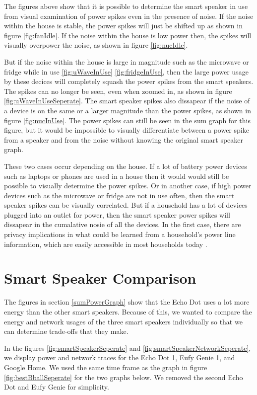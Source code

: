 The figures above show that it is possible to determine the smart speaker in use from visual examination of power spikes even in the presence of noise. If the noise within the house is stable, the power spikes will just be shifted up as shown in figure \ref{fig:fanIdle}. If the noise within the house is low power then, the spikes will visually overpower the noise, as shown in figure \ref{fig:nucIdle}.

But if the noise within the house is large in magnitude such as the microwave or fridge while in use \ref{fig:uWaveInUse} \ref{fig:fridgeInUse}, then the large power usage by these decices will completely squash the power spikes from the smart speakers. The spikes can no longer be seen, even when zoomed in, as shown in figure \ref{fig:uWaveInUseSeperate}. The smart speaker spikes also dissapear if the noise of a device is on the same or a larger magnitude than the power spikes, as shown in figure \ref{fig:nucInUse}. The power spikes can still be seen in the sum graph for this figure, but it would be impossible to visually differentiate between a power spike from a speaker and from the noise without knowing the original smart speaker graph.

These two cases occur depending on the house. If a lot of battery power devices such as laptops or phones are used in a house then it would would still be possible to visually determine the power spikes. Or in another case, if high power devices such as the microwave or fridge are not in use often, then the smart speaker spikes can be visually correlated. But if a household has a lot of devices plugged into an outlet for power, then the smart speaker power spikes will dissapear in the cumalative nosie of all the devices. In the first case, there are privacy implications in what could be learned from a household's power line information, which are easily accessible in most households today \cite{griffith_2017}.

\section{Smart Speaker Comparison}
\label{smartSpeakerComparisonSection}
The figures in section \ref{sumPowerGraph} show that the Echo Dot uses a lot more energy than the other smart speakers. Because of this, we wanted to compare the energy and network usages of the three smart speakers individually so that we can determine trade-offs that they make.

In the figures \ref{fig:smartSpeakerSeperate} and \ref{fig:smartSpeakerNetworkSeperate}, we display power and network traces for the Echo Dot 1, Eufy Genie 1, and Google Home. We used the same time frame as the graph in figure \ref{fig:bestBballSeperate} for the two graphs below. We removed the second Echo Dot and Eufy Genie for simplicity.


